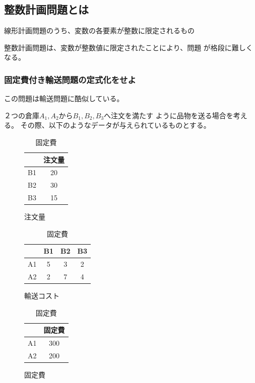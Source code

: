 \documentclass[9pt]{ltjsreport}
\begin{document}
\subsection{整数計画問題とは}
線形計画問題のうち、変数の各要素が整数に限定されるもの

整数計画問題は、変数が整数値に限定されたことにより、問題
が格段に難しくなる。

\subsubsection{固定費付き輸送問題の定式化をせよ}
この問題は輸送問題に酷似している。

２つの倉庫$A_1,A_2$から$B_1,B_2,B_3$へ注文を満たす
ように品物を送る場合を考える。
その際、以下のようなデータが与えられているものとする。
\begin{table}[h]
    \centering
    \caption{固定費付き輸送問題のデータ}
    \begin{subfigure}{0.3\columnwidth}
        \centering
        \caption{注文量}
        \begin{tabular}{cc}\toprule
              &注文量\\ \midrule
            B1&20\\
            B2&30\\
            B3&15\\ \bottomrule
        \end{tabular}
    \end{subfigure}
    \begin{subfigure}{0.3\columnwidth}
        \centering
        \caption{輸送コスト}
        \begin{tabular}{cccc}\toprule
              &B1&B2&B3\\ \midrule
            A1&5&3&2\\
            A2&2&7&4\\ \bottomrule
        \end{tabular}
    \end{subfigure}
    \begin{subfigure}{0.3\columnwidth}
        \centering
        \caption{固定費}
        \begin{tabular}{cc}\toprule
              &固定費\\ \midrule
            A1&300\\
            A2&200\\ \bottomrule
        \end{tabular}
    \end{subfigure}
\end{table}
\end{document}
